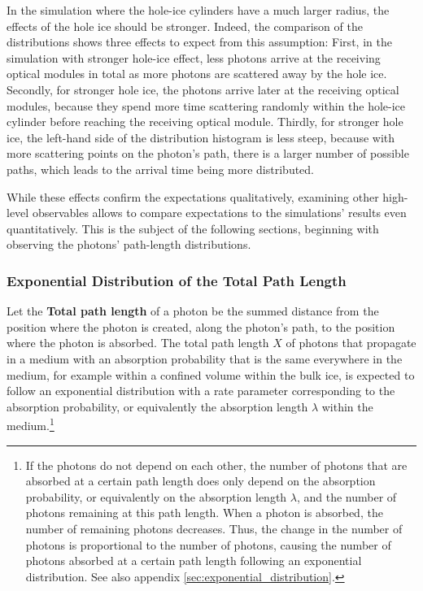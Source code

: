 In the simulation where the hole-ice cylinders have a much larger
radius, the effects of the hole ice should be stronger. Indeed, the
comparison of the distributions shows three effects to expect from this
assumption: First, in the simulation with stronger hole-ice effect, less
photons arrive at the receiving optical modules in total as more photons
are scattered away by the hole ice. Secondly, for stronger hole ice, the
photons arrive later at the receiving optical modules, because they
spend more time scattering randomly within the hole-ice cylinder before
reaching the receiving optical module. Thirdly, for stronger hole ice,
the left-hand side of the distribution histogram is less steep, because
with more scattering points on the photon's path, there is a larger
number of possible paths, which leads to the arrival time being more
distributed.

While these effects confirm the expectations qualitatively, examining
other high-level observables allows to compare expectations to the
simulations' results even quantitatively. This is the subject of the
following sections, beginning with observing the photons' path-length
distributions.

\FloatBarrier\newpage
\subsubsection{Exponential Distribution of the Total Path Length}
\label{sec:total_path_length_distribution}

Let the \textbf{Total path length} of a photon be the summed distance
from the position where the photon is created, along the photon's path,
to the position where the photon is absorbed. The total path length
\(X\) of photons that propagate in a medium with an absorption
probability that is the same everywhere in the medium, for example
within a confined volume within the bulk ice, is expected to follow an
exponential distribution with a rate parameter corresponding to the
absorption probability, or equivalently the absorption length
\(\lambda\) within the
medium.\footnote{If the photons do not depend on each other, the number of photons that are absorbed at a certain path length does only depend on the absorption probability, or equivalently on the absorption length $\lambda$, and the number of photons remaining at this path length. When a photon is absorbed, the number of remaining photons decreases. Thus, the change in the number of photons is proportional to the number of photons, causing the number of photons absorbed at a certain path length following an exponential distribution. See also appendix \ref{sec:exponential_distribution}.}

